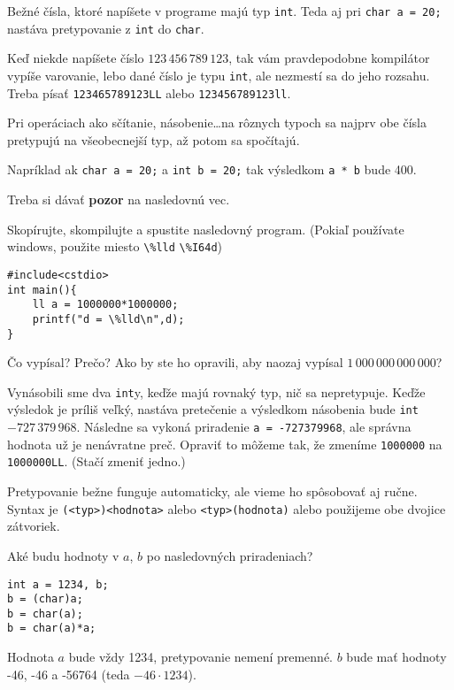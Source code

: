 \medskip

Bežné čísla, ktoré napíšete v programe majú typ \verb!int!.  Teda aj pri
\verb!char a = 20;! nastáva pretypovanie z \verb!int! do \verb!char!.

Keď niekde napíšete číslo $123\,456\,789\,123$, tak vám pravdepodobne kompilátor
vypíše varovanie, lebo dané číslo je typu \verb!int!, ale nezmestí sa do jeho
rozsahu. Treba písať \verb!123465789123LL! alebo \verb!123456789123ll!.

\medskip

Pri operáciach ako sčítanie, násobenie\dots na rôznych typoch sa najprv obe
čísla pretypujú na všeobecnejší typ, až potom sa spočítajú.

Napríklad ak \verb!char a = 20;! a \verb!int b = 20;! tak výsledkom \verb!a * b!
bude 400.

Treba si dávať \textbf{pozor} na nasledovnú vec.

\cvicenie Skopírujte, skompilujte a spustite nasledovný program.  (Pokiaľ
používate windows, použite miesto \verb!\%lld! \verb!\%I64d!)
\begin{lstlisting}
#include<cstdio>
int main(){
    ll a = 1000000*1000000;    
    printf("d = \%lld\n",d);
}
\end{lstlisting}
Čo vypísal? Prečo? Ako by ste ho opravili, aby naozaj vypísal
$1\,000\,000\,000\,000$?

\riesenie Vynásobili sme dva \verb!int!y, keďže majú rovnaký typ, nič sa
nepretypuje.  Keďže výsledok je príliš veľký, nastáva pretečenie a výsledkom
násobenia bude \verb!int!  $-727\,379\,968$. Následne sa vykoná priradenie
\verb!a = -727379968!, ale správna hodnota už je nenávratne preč. Opraviť to
môžeme tak, že zmeníme \verb!1000000! na \verb!1000000LL!. (Stačí zmeniť
jedno.)

\medskip

Pretypovanie bežne funguje automaticky, ale vieme ho spôsobovať aj ručne.
Syntax je \verb!(<typ>)<hodnota>! alebo \verb!<typ>(hodnota)! alebo použijeme
obe dvojice zátvoriek.

\cvicenie Aké budu hodnoty v $a$, $b$ po nasledovných priradeniach? 
\begin{lstlisting}
int a = 1234, b;
b = (char)a;
b = char(a);
b = char(a)*a;
\end{lstlisting}

\riesenie Hodnota $a$ bude vždy 1234, pretypovanie nemení premenné. 
$b$ bude mať hodnoty -46, -46 a -56764 (teda $-46\cdot 1234$).

\medskip

